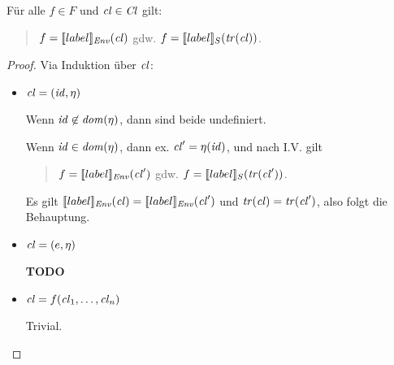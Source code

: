\documentclass[12pt,a4paper]{article}
\begin{document}
\begin{lemma}
  F\"ur alle $f \in F$ und $\mathit{cl} \in \mathit{Cl}$ gilt:
  \begin{quote}
  $f = [\![label]\!]_{\mathit{Env}}(\mathit{cl})$ gdw. $f = [\![label]\!]_S(\mathit{tr}(\mathit{cl}))$.
  \end{quote}
\end{lemma}

\begin{proof}
  Via Induktion \"uber $\mathit{cl}$:
  \begin{itemize}
  \item $\mathit{cl} = (\mathit{id},\eta)$

    Wenn $\mathit{id} \not\in \mathit{dom}(\eta)$, dann sind beide undefiniert.

    Wenn $\mathit{id} \in \mathit{dom}(\eta)$, dann ex. $\mathit{cl}' = \eta(\mathit{id})$, und nach I.V. gilt
    \begin{quote}
      $f = [\![label]\!]_{\mathit{Env}}(\mathit{cl}')$ gdw. $f = [\![label]\!]_S(\mathit{tr}(\mathit{cl}'))$.
    \end{quote}
    Es gilt $[\![label]\!]_{\mathit{Env}}(\mathit{cl}) = [\![label]\!]_{\mathit{Env}}(\mathit{cl}')$ und
    $\mathit{tr}(\mathit{cl}) = \mathit{tr}(\mathit{cl}')$, also folgt die Behauptung.

  \item $\mathit{cl} = (e,\eta)$

    \textbf{TODO}

  \item $\mathit{cl} = f(\mathit{cl}_1,\ldots,\mathit{cl}_n)$

    Trivial.

  \end{itemize}
\end{proof}
\end{document}
